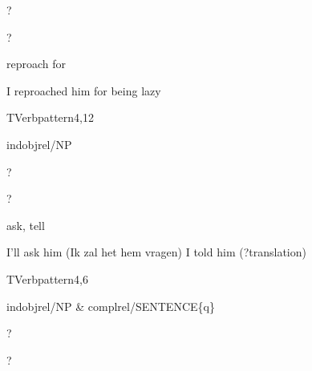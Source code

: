 
\begin{thetadescr}
\evitem ?
\esitem
     \begin{examples}
        \example ?
     \end{examples}
\end{thetadescr}



\begin{thetadescr}
\evitem reproach for
\esitem
     \begin{examples}
        \example I reproached him for being lazy
     \end{examples}
\end{thetadescr}


\newpage
{}
\begin{vpattern}
 TVerbpattern4,12
\csritem \mbox{}\\
     \begin{csr}
      indobjrel/NP 
     \end{csr}
\remarksitem
\end{vpattern}


\begin{thetadescr}
\evitem ?
\esitem
     \begin{examples}
        \example ?
     \end{examples}
\end{thetadescr}



\begin{thetadescr}
\evitem ask, tell
\esitem
     \begin{examples}
        \example I'll ask him (Ik zal het hem vragen)
        \example I told him (?translation)
     \end{examples}
\end{thetadescr}


\newpage
{}
\begin{vpattern}
 TVerbpattern4,6
\csritem \mbox{}\\
     \begin{csr}
      indobjrel/NP & complrel/SENTENCE\{q\}
     \end{csr}
\remarksitem
\end{vpattern}


\begin{thetadescr}
\evitem ?
\esitem
     \begin{examples}
        \example ?
     \end{examples}
\end{thetadescr}


